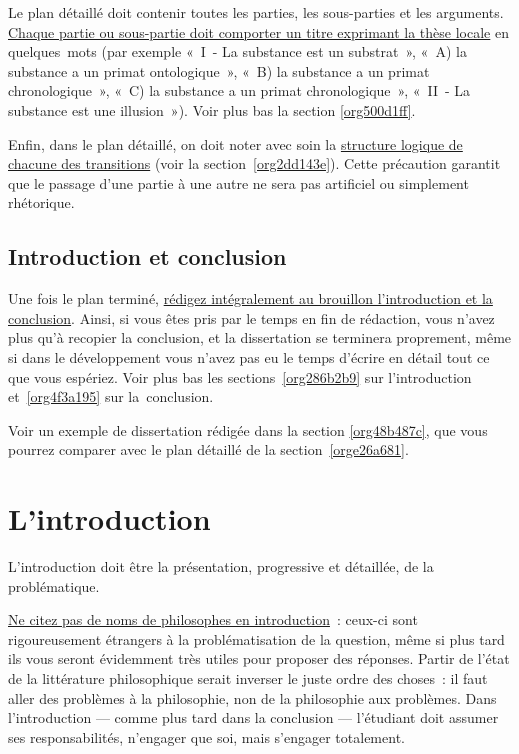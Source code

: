 \documentclass[a4paper,12pt]{article}
\begin{document}
Le plan détaillé doit contenir toutes les parties, les sous-parties et
les arguments. \uline{Chaque partie ou sous-partie doit comporter un titre
exprimant la thèse locale} en quelques mots (par exemple « I - La
substance est un substrat », « A) la substance a un primat
ontologique », « B) la substance a un primat chronologique », « C) la
substance a un primat chronologique », « II - La substance est une
illusion »). Voir plus bas la section \ref{org500d1ff}.

Enfin, dans le plan détaillé, on doit noter avec soin la \uline{structure
logique de chacune des transitions} (voir la section \ref{org2dd143e}). Cette
précaution garantit que le passage d'une partie à une autre ne sera pas
artificiel ou simplement rhétorique.

\subsection{Introduction et conclusion}
\label{sec:orgc682359}

Une fois le plan terminé, \uline{rédigez intégralement au brouillon
l'introduction et la conclusion}. Ainsi, si vous êtes pris par le temps
en fin de rédaction, vous n'avez plus qu'à recopier la conclusion, et la
dissertation se terminera proprement, même si dans le développement vous
n'avez pas eu le temps d'écrire en détail tout ce que vous espériez.
Voir plus bas les sections \ref{org286b2b9} sur l'introduction et \ref{org4f3a195}
sur la conclusion.

Voir un exemple de dissertation rédigée dans la section \ref{org48b487c}, que
vous pourrez comparer avec le plan détaillé de la section \ref{orge26a681}.

\section{L'introduction}
\label{sec:org3e04234}
\label{org286b2b9}

L'introduction doit être la présentation, progressive et détaillée, de
la problématique.

\uline{Ne citez pas de noms de philosophes en introduction} : ceux-ci sont
rigoureusement étrangers à la problématisation de la question, même si
plus tard ils vous seront évidemment très utiles pour proposer des
réponses. Partir de l'état de la littérature philosophique serait
inverser le juste ordre des choses : il faut aller des problèmes à la
philosophie, non de la philosophie aux problèmes. Dans l'introduction
--- comme plus tard dans la conclusion --- l'étudiant doit assumer ses
responsabilités, n'engager que soi, mais s'engager totalement. 
\end{document}
